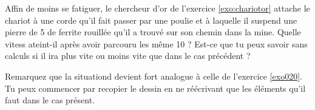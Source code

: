 

\begin{exercice}\label{exo025}

Affin de moins se fatiguer, le chercheur d'or de l'exercice \ref{exo:chariotor} attache le chariot à une corde qu'il fait passer par une poulie et à laquelle il suspend une pierre de \unit{5}{\kilogram} de ferrite rouill\'ee qu'il a trouv\'e sur son chemin dans la mine. Quelle vitess ateint-il après avoir parcouru les même \unit{10}{\meter} ? Est-ce que tu peux savoir sans calculs si il ira plus vite ou moins vite que dans le cas précédent ?

Remarquez que la situationd devient fort analogue à celle de l'exercice \ref{exo020}. Tu peux commencer par recopier le dessin en ne réécrivant que les éléments qu'il faut dans le cas présent.
\end{exercice}
